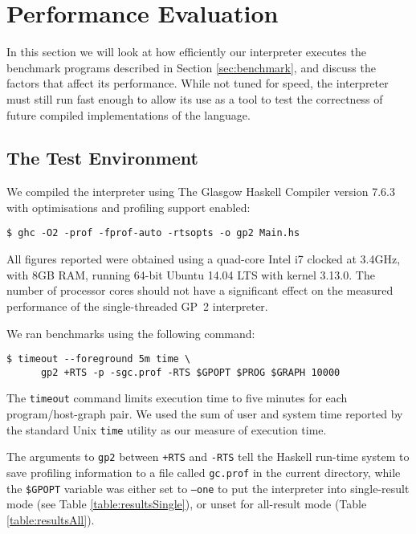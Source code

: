 \section{Performance Evaluation}
\label{sec:performanceevaluation}

In this section we will look at how efficiently our interpreter executes the benchmark programs described in Section \ref{sec:benchmark}, and discuss the factors that affect its performance. While not tuned for speed, the interpreter must still run fast enough to allow its use as a tool to test the correctness of future compiled implementations of the language.




\subsection{The Test Environment}

We compiled the interpreter using The Glasgow Haskell Compiler\cite{ghc} version 7.6.3 with optimisations and profiling support enabled:

\begin{verbatim}
$ ghc -O2 -prof -fprof-auto -rtsopts -o gp2 Main.hs
\end{verbatim}

All figures reported were obtained using a quad-core Intel i7 clocked at 3.4GHz, with 8GB RAM, running 64-bit Ubuntu 14.04 LTS with kernel 3.13.0. The number of processor cores should not have a significant effect on the measured performance of the single-threaded GP~2 interpreter.

We ran benchmarks using the following command:

\begin{verbatim}
$ timeout --foreground 5m time \
      gp2 +RTS -p -sgc.prof -RTS $GPOPT $PROG $GRAPH 10000
\end{verbatim}

The \texttt{timeout} command limits execution time to five minutes for each program/host-graph pair. We used the sum of user and system time reported by the standard Unix \texttt{time} utility as our measure of execution time.

The arguments to \texttt{gp2} between \texttt{+RTS} and \texttt{-RTS} tell the Haskell run-time system to save profiling information to a file called \texttt{gc.prof} in the current directory, while the \texttt{\$GPOPT} variable was either set to \texttt{--one} to put the interpreter into single-result mode (see Table \ref{table:resultsSingle}), or unset for all-result mode (Table \ref{table:resultsAll}).

